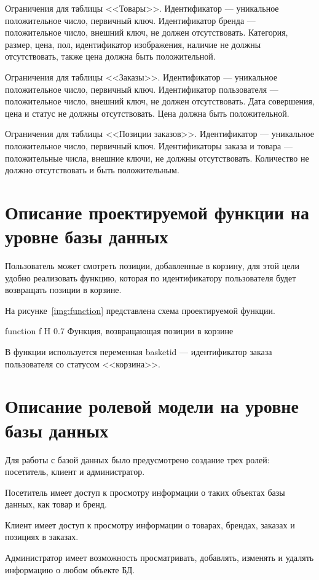 \documentclass{bmstu}
\begin{document}
Ограничения для таблицы <<Товары>>. 
Идентификатор --- уникальное положительное число, первичный ключ. 
Идентификатор бренда --- положительное число, внешний ключ, не должен отсутствовать. 
Категория, размер, цена, пол, идентификатор изображения, наличие не должны отсутствовать, также цена должна быть положительной.

Ограничения для таблицы <<Заказы>>. 
Идентификатор --- уникальное положительное число, первичный ключ. 
Идентификатор пользователя --- положительное число, внешний ключ, не должен отсутствовать. 
Дата совершения, цена и статус не должны отсутствовать. Цена должна быть положительной.

Ограничения для таблицы <<Позиции заказов>>. 
Идентификатор --- уникальное положительное число, первичный ключ. 
Идентификаторы заказа и товара --- положительные числа, внешние ключи, не должны отсутствовать. 
Количество не должно отсутствовать и быть положительным.

\section{Описание проектируемой функции на уровне базы данных}

Пользователь может смотреть позиции, добавленные в корзину, для этой цели удобно реализовать функцию, которая по идентификатору пользователя будет возвращать позиции в корзине.

На рисунке~\ref{img:function} представлена схема проектируемой функции.

    {function}
    {f}
    {H}
    {0.7\textwidth}
    {Функция, возвращающая позиции в корзине}

В функции используется переменная basket\textunderscore id --- идентификатор заказа пользователя со статусом <<корзина>>.

\section{Описание ролевой модели на уровне базы данных}

Для работы с базой данных было предусмотрено создание трех ролей: посетитель, клиент и администратор.

Посетитель имеет доступ к просмотру информации о таких объектах базы данных, как товар и бренд.

Клиент имеет доступ к просмотру информации о товарах, брендах, заказах и позициях в заказах.

Администратор имеет возможность просматривать, добавлять, изменять и удалять информацию о любом объекте БД.
\end{document}

